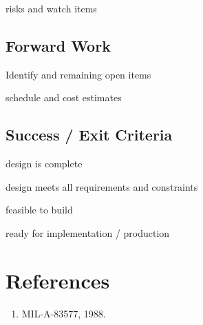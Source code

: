 \documentclass[12pt]{article}
\begin{document}
risks and watch items


\subsection{Forward Work}

Identify and remaining open items

schedule and cost estimates


\subsection{Success / Exit Criteria}

design is complete

design meets all requirements and constraints

feasible to build

ready for implementation / production






\section*{References}

\begin{enumerate}
\item MIL-A-83577, 1988.
\end{enumerate}
\end{document}
